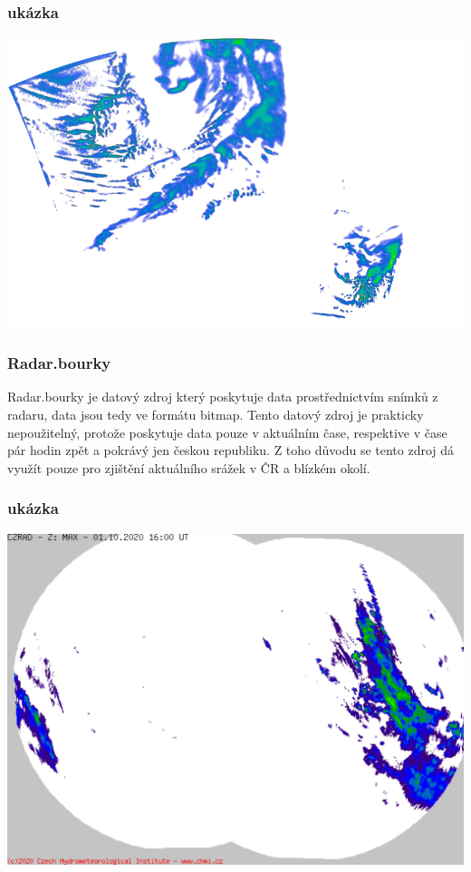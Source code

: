 \documentclass[czech,bachelor,dept460,male,csharp,cpdeclaration]{diploma}
\begin{document}
	\subsubsection{ukázka}
	
	\includegraphics[scale=0.5]{Data/Mdrd_ukazka.png}
	
	\subsubsection{Radar.bourky}
	
	Radar.bourky je datový zdroj který poskytuje data prostřednictvím snímků z radaru, data jsou tedy ve formátu bitmap. Tento datový zdroj je prakticky nepoužitelný, protože poskytuje data pouze v aktuálním čase, respektive v čase pár hodin zpět a pokrávý jen českou republiku. Z toho důvodu se tento zdroj dá využít pouze pro zjištění aktuálního srážek v ČR a blízkém okolí.
	
	\subsubsection{ukázka}
	
	\includegraphics[scale=0.5]{Data/Rb_ukazka.png}
	
\end{document}
